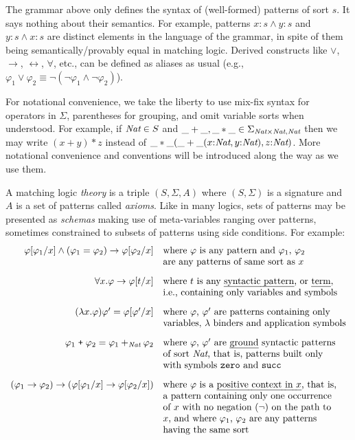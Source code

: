 \documentclass[UTF8]{article}
\theoremstyle{plain}
\theoremstyle{definition}
\theoremstyle{remark}
\newcommand{\cln}{{:}}
\begin{document}
The grammar above only defines the syntax of (well-formed) patterns of sort
$s$.
It says nothing about their semantics.
For example, patterns $x\cln s \wedge y \cln s$ and
$y\cln s \wedge x \cln s$ are distinct elements in the language
of the grammar, in spite of them being semantically/provably equal
in matching logic.
Derived constructs like $\vee$, $\rightarrow$, $\leftrightarrow$,
$\forall$, etc., can be defined as aliases as usual (e.g.,
$\varphi_1 \vee \varphi_2 \equiv \neg(\neg \varphi_1 \wedge \neg\varphi_2)$).

For notational convenience, we take the liberty to use mix-fix syntax for
operators in $\Sigma$,
parentheses for grouping, and omit variable sorts when understood.
For example, if $\textit{Nat} \in S$ and
$\_+\_, \_*\_ \in \Sigma_{\textit{Nat} \times \textit{Nat}, \textit{Nat}}$
then we may write $(x + y)*z$ instead of
$\_*\_(\_+\_(x\cln\Nat,y\cln\Nat),z\cln\Nat)$.
More notational convenience and conventions will be introduced along the way
as we use them. 

A matching logic \emph{theory} is a triple $(S, \Sigma, A)$ where
$(S,\Sigma)$ is a signature and $A$ is a set of patterns called \emph{axioms}.
Like in many logics, sets of patterns may be presented as \emph{schemas}
making use of meta-variables ranging over patterns, sometimes constrained
to subsets of patterns using side conditions.
For example:
$$
\begin{array}{rl}
\varphi[\varphi_1/x] \wedge (\varphi_1 = \varphi_2) \rightarrow \varphi[\varphi_2/x]
&\textrm{where $\varphi$ is any pattern and $\varphi_1$, $\varphi_2$} \\
& \textrm{are any patterns of same sort as $x$}
\\[2ex]
\forall x . \varphi \rightarrow \varphi[t/x]
&\textrm{where $t$ is any \emph{syntactic pattern}, or \emph{term}}, \\
& \textrm{i.e., containing only variables and symbols}
\\[2ex]
(\lambda x . \varphi)\varphi' = \varphi[\varphi'/x]
& \textrm{where $\varphi$, $\varphi'$ are patterns containing only}
\\
& \textrm{variables, $\lambda$ binders and application symbols}
\\[2ex]
\varphi_1 \mathrel{\texttt{+}} \varphi_2 = \varphi_1 +_{\textit{Nat}} \varphi_2
& \textrm{where $\varphi$, $\varphi'$ are \emph{ground} syntactic patterns}
\\
&\textrm{of sort $\textit{Nat}$, that is, patterns built only}
\\
&\textrm{with symbols \texttt{zero} and \texttt{succ}}
\\[2ex]
(\varphi_1 \rightarrow \varphi_2) \rightarrow
(\varphi[\varphi_1 / x] \rightarrow \varphi[\varphi_2 / x])
& \textrm{where $\varphi$ is a \emph{positive context in $x$}, that is,}
\\
& \textrm{a pattern
containing only one occurrence}
\\
&\textrm{of $x$ with no negation ($\neg$) on the path to}
\\
&\textrm{$x$, and where $\varphi_1$, $\varphi_2$ are any patterns}
\\
&\textrm{having the same sort}
\end{array}
$$
\end{document}

